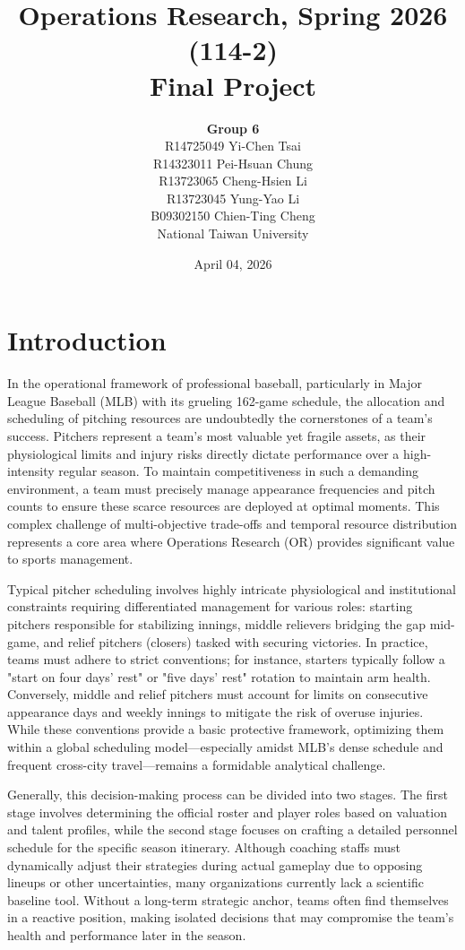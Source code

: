 \documentclass[11pt, a4paper]{article}
\title{Operations Research, Spring 2026 (114-2) \\ Final Project}
\author{
    \textbf{Group 6} \\[0.4cm] %
    R14725049 Yi-Chen Tsai \\[0.4cm]
    R14323011 Pei-Hsuan Chung \\[0.4cm]
    R13723065 Cheng-Hsien Li \\[0.4cm]
    R13723045 Yung-Yao Li	 \\[0.4cm]
    B09302150 Chien-Ting Cheng\\[0.4cm]
    National Taiwan University \\[0.4cm]
}
\date{April 04, 2026}
\begin{document}
\maketitle

\section{Introduction}

In the operational framework of professional baseball, particularly in Major League Baseball (MLB) with its grueling 162-game schedule, the allocation and scheduling of pitching resources are undoubtedly the cornerstones of a team's success.
Pitchers represent a team's most valuable yet fragile assets, as their physiological limits and injury risks directly dictate performance over a high-intensity regular season.
To maintain competitiveness in such a demanding environment, a team must precisely manage appearance frequencies and pitch counts to ensure these scarce resources are deployed at optimal moments.
This complex challenge of multi-objective trade-offs and temporal resource distribution represents a core area where Operations Research (OR) provides significant value to sports management.

Typical pitcher scheduling involves highly intricate physiological and institutional constraints requiring differentiated management for various roles: starting pitchers responsible for stabilizing innings, middle relievers bridging the gap mid-game, and relief pitchers (closers) tasked with securing victories. In practice, teams must adhere to strict conventions; for instance, starters typically follow a "start on four days’ rest" or "five days’ rest" rotation to maintain arm health. Conversely, middle and relief pitchers must account for limits on consecutive appearance days and weekly innings to mitigate the risk of overuse injuries. While these conventions provide a basic protective framework, optimizing them within a global scheduling model—especially amidst MLB’s dense schedule and frequent cross-city travel—remains a formidable analytical challenge.

Generally, this decision-making process can be divided into two stages.
The first stage involves determining the official roster and player roles based on valuation and talent profiles, while the second stage focuses on crafting a detailed personnel schedule for the specific season itinerary.
Although coaching staffs must dynamically adjust their strategies during actual gameplay due to opposing lineups or other uncertainties, many organizations currently lack a scientific baseline tool.
Without a long-term strategic anchor, teams often find themselves in a reactive position, making isolated decisions that may compromise the team's health and performance later in the season.
\end{document}
